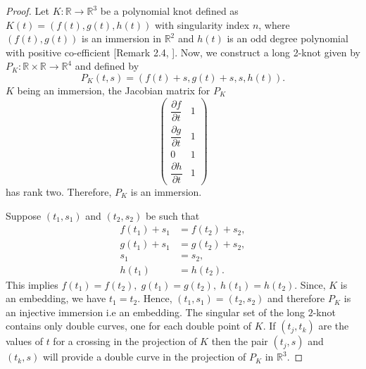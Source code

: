 \documentclass[10pt,a4paper,reqno]{amsart}
\theoremstyle{definition}
\theoremstyle{remark}
\newcommand{\R}{\mathbb R}
\begin{document}
 \begin{proof}
 	Let $K : \R \rightarrow \R^{3}$ be a polynomial knot defined as $K(t) = (f (t), g(t), h(t))$ with singularity index $n$, where $(f(t),g(t))$ is an immersion in $\R^{2}$ and $h(t)$ is an odd degree polynomial with positive co-efficient [Remark 2.4, \cite{Mis14}].
 	Now, we construct a long 2-knot given by $P_{K}: \R \times \R \rightarrow \R^{4}$ and defined by
 	\[P_{K}(t,s)= (f(t)+s, g(t)+s, s, h(t)).\]
 	$K$ being an immersion, the  Jacobian matrix for $P_{K}$ 
 	\[\begin{pmatrix}
 		\dfrac{\partial f}{\partial t} & 1 \\[0.3cm]
 		\dfrac{\partial g}{\partial t} & 1 \\[0.2cm]
 		0 & 1 \\[0.1cm]
 		\dfrac{\partial h}{\partial t} & 1 
 	\end{pmatrix}\]
 	has rank two. Therefore, $P_{K}$ is an immersion.
 	
 	Suppose $(t_{1},s_{1})$ and $(t_{2},s_{2})$ be such that
 		\begin{align*}
 		f(t_{1})+s_{1}&=f(t_{2})+s_{2},\\
 		g(t_{1})+s_{1}&=g(t_{2})+s_{2}, \\
 		s_{1}&= s_{2}, \\
 		h(t_{1}) &= h(t_{2}).
 	\end{align*}
 	This implies $
 		f(t_{1})=f(t_{2}),\;
 		g(t_{1})=g(t_{2}),\;
 		h(t_{1}) = h(t_{2}).$
 	Since, $K$ is an embedding, we have $ t_{1}=t_{2}$.
 	Hence, $(t_{1},s_{1}) = (t_{2},s_{2})$ and therefore $P_{K}$ is an injective immersion  i.e an embedding.
 	The singular set of the long $2$-knot contains only double curves, one for each double point of $K$. If $(t_{j}, t_{k})$ are the values of $t$ for a crossing in the projection of $K$ then the pair $(t_{j},s)$ and $(t_{k},s)$ will provide a double curve in the projection of $P_{K}$ in $\R^{3}$.
 	

\end{proof}
\end{document}
